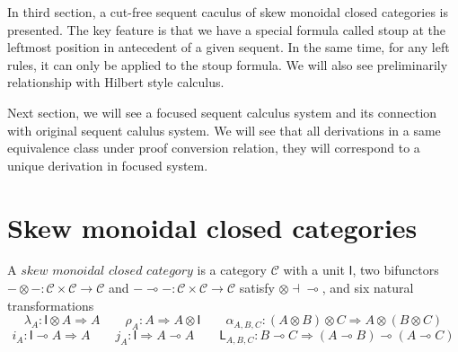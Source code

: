 \documentclass{article}
\newcommand{\ot}{\otimes}
\newcommand{\lolli}{\multimap}
\newcommand{\I}{\mathsf{I}}
\newcommand{\msfL}{\mathsf{L}}
\begin{document}
In third section, a cut-free sequent caculus of skew monoidal closed categories is presented.
The key feature is that we have a special formula called stoup at the leftmost position in antecedent of a given sequent.
In the same time, for any left rules, it can only be applied to the stoup formula.
We will also see preliminarily relationship with Hilbert style calculus.

Next section, we will see a focused sequent calculus system and its connection with original sequent calulus system.
We will see that all derivations in a same equivalence class under proof conversion relation, they will correspond to a unique derivation in focused system.


\section{Skew monoidal closed categories}
A $skew$ $monoidal$ $closed$ $category$\cite{street_skew-closed_2013} is a category $\mathcal{C}$ with a unit $\mathsf{I}$, two bifunctors $- \ot - : \mathcal{C} \times \mathcal{C} \longrightarrow \mathcal{C}$ and $- \lolli - : \mathcal{C} \times \mathcal{C} \longrightarrow \mathcal{C}$
satisfy $\ot \dashv \lolli$, and six natural transformations
\begin{displaymath}
  \lambda_A : \mathsf{I} \otimes A \Longrightarrow A \qquad
  \rho_A : A \Longrightarrow A \otimes \mathsf{I} \qquad
  \alpha_{A,B,C} : (A\otimes B) \otimes C \Longrightarrow A\otimes (B\otimes C)
\end{displaymath}
\begin{displaymath}
  i_A : \I \lolli A \Longrightarrow A \qquad
  j_A : \I \Longrightarrow A \lolli A \qquad
  \msfL_{A, B, C} : B \lolli C \Longrightarrow (A \lolli B) \lolli (A \lolli C)
\end{displaymath}
\end{document}
